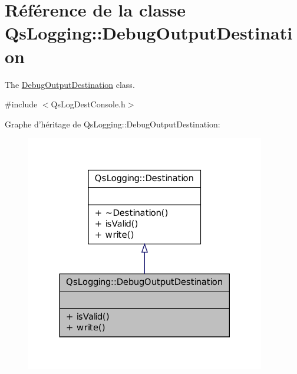\hypertarget{classQsLogging_1_1DebugOutputDestination}{\section{Référence de la classe Qs\-Logging\-:\-:Debug\-Output\-Destination}
\label{classQsLogging_1_1DebugOutputDestination}
}


The \hyperlink{classQsLogging_1_1DebugOutputDestination}{Debug\-Output\-Destination} class.  




{\ttfamily \#include $<$Qs\-Log\-Dest\-Console.\-h$>$}



Graphe d'héritage de Qs\-Logging\-:\-:Debug\-Output\-Destination\-:
\nopagebreak
\begin{figure}[H]
\begin{center}
\leavevmode
\includegraphics[width=296pt]{classQsLogging_1_1DebugOutputDestination__inherit__graph}
\end{center}
\end{figure}


